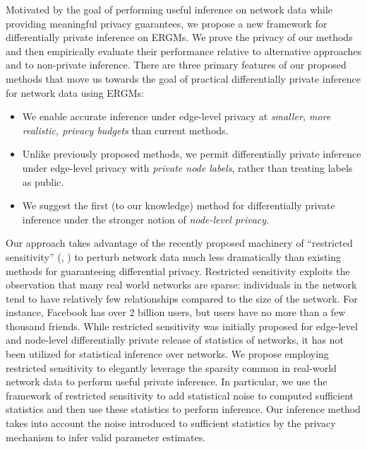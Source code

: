 Motivated by the goal of performing useful inference on network data while providing meaningful privacy guarantees, we propose a new framework for differentially private inference on ERGMs. We prove the privacy of our methods and then empirically evaluate their performance relative to alternative approaches and to non-private inference. There are three primary features of our proposed methods that move us towards the goal of practical differentially private inference for network data using ERGMs:
\begin{itemize}
	\item We enable accurate inference under edge-level privacy at \emph{smaller, more realistic, privacy budgets} than current methods.
	\item Unlike previously proposed methods, we permit differentially private inference under edge-level privacy with \emph{private node labels}, rather than treating labels as public.
	\item We suggest the first (to our knowledge) method for differentially private inference under the stronger notion of \emph{node-level privacy}.
\end{itemize}

Our approach takes advantage of the recently proposed machinery of ``restricted sensitivity'' (\cite{BBDS13}, \cite{KNRS13}) to perturb network data much less dramatically than existing methods for guaranteeing differential privacy. Restricted sensitivity exploits the observation that many real world networks are sparse: individuals in the network tend to have relatively few relationships compared to the size of the network. For instance, Facebook has over 2 billion users, but users have no more than a few thousand friends. While restricted sensitivity was initially proposed for edge-level and node-level differentially private release of statistics of networks, it has not been utilized for statistical inference over networks. We propose employing restricted sensitivity to elegantly leverage the sparsity common in real-world network data to perform useful private inference. In particular, we use the framework of restricted sensitivity to add statistical noise to computed sufficient statistics and then use these statistics to perform inference. Our inference method takes into account the noise introduced to sufficient statistics by the privacy mechanism to infer valid parameter estimates. 

